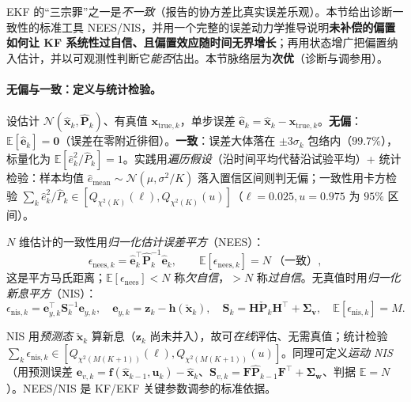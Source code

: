 EKF 的“三宗罪”之一是\emph{不一致}（报告的协方差比真实误差乐观）。本节给出诊断一致性的标准工具 NEES/NIS，并用一个完整的误差动力学推导说明\textbf{未补偿的偏置如何让 KF 系统性过自信、且偏置效应随时间无界增长}；再用状态增广把偏置纳入估计，并以可观测性判断它\emph{能否}估出。本节脉络层为\textbf{次优}（诊断与调参用）。

\paragraph{无偏与一致：定义与统计检验。}
设估计 $\mathcal{N}(\hat{\mathbf{x}}_k,\hat{\mathbf{P}}_k)$、有真值 $\mathbf{x}_{\text{true},k}$，单步误差 $\hat{\mathbf{e}}_k=\hat{\mathbf{x}}_k-\mathbf{x}_{\text{true},k}$。\textbf{无偏}：$\mathbb{E}[\hat{\mathbf{e}}_k]=\mathbf{0}$（误差在零附近徘徊）。\textbf{一致}：误差大体落在 $\pm3\sigma_k$ 包络内（$99.7\%$），标量化为 $\mathbb{E}[\hat{e}_k^2/\hat{P}_k]=1$\cite{barfoot2024state}。实践用\emph{遍历假设}（沿时间平均代替沿试验平均）+ 统计检验：样本均值 $\hat{e}_{\text{mean}}\sim\mathcal{N}(\mu,\sigma^2/K)$ 落入置信区间则判无偏；一致性用卡方检验 $\sum_k\hat{e}_k^2/\hat{P}_k\in[Q_{\chi^2(K)}(\ell),Q_{\chi^2(K)}(u)]$（$\ell=0.025,u=0.975$ 为 $95\%$ 区间）。

\begin{definition}\label{def:nees-nis}
$N$ 维估计的一致性用\emph{归一化估计误差平方}（NEES）：
\begin{equation}
  \epsilon_{\text{nees},k}=\hat{\mathbf{e}}_k^\top\hat{\mathbf{P}}_k^{-1}\hat{\mathbf{e}}_k,\qquad
  \mathbb{E}[\epsilon_{\text{nees},k}]=N\ \text{（一致）},
  \label{eq:nees}
\end{equation}
这是平方马氏距离；$\mathbb{E}[\epsilon_{\text{nees}}]<N$ 称\emph{欠自信}，$>N$ 称\emph{过自信}。无真值时用\emph{归一化新息平方}（NIS）：
\begin{equation}
  \epsilon_{\text{nis},k}=\mathbf{e}_{y,k}^\top\mathbf{S}_k^{-1}\mathbf{e}_{y,k},\quad
  \mathbf{e}_{y,k}=\mathbf{z}_k-\mathbf{h}(\check{\mathbf{x}}_k),\quad
  \mathbf{S}_k=\mathbf{H}\check{\mathbf{P}}_k\mathbf{H}^\top+\boldsymbol{\Sigma}_{\mathbf{v}},\quad
  \mathbb{E}[\epsilon_{\text{nis},k}]=M.
  \label{eq:nis}
\end{equation}
\end{definition}
NIS 用\emph{预测态} $\check{\mathbf{x}}_k$ 算新息（$\mathbf{z}_k$ 尚未并入），故可\emph{在线}评估、无需真值；统计检验 $\sum_k\epsilon_{\text{nis},k}\in[Q_{\chi^2(M(K+1))}(\ell),Q_{\chi^2(M(K+1))}(u)]$。同理可定义\emph{运动 NIS}（用预测误差 $\mathbf{e}_{v,k}=\mathbf{f}(\hat{\mathbf{x}}_{k-1},\mathbf{u}_k)-\hat{\mathbf{x}}_k$、$\mathbf{S}_{v,k}=\mathbf{F}\hat{\mathbf{P}}_{k-1}\mathbf{F}^\top+\boldsymbol{\Sigma}_{\mathbf{w}}$、判据 $\mathbb{E}=N$）。NEES/NIS 是 KF/EKF 关键参数调参的标准依据\cite{barfoot2024state}。

